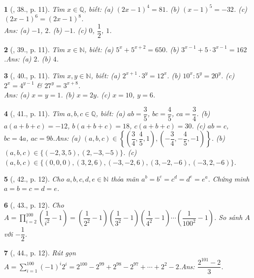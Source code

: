 \documentclass{article}
\newtheorem{baitoan}{}
\begin{document}
\begin{baitoan}[\cite{Binh_Toan_7_tap_1}, 38., p. 11]
	Tìm $x\in\mathbb{Q}$, biết: (a) $(2x - 1)^4 = 81$. (b) $(x - 1)^5 = -32$. (c) $(2x - 1)^6 = (2x - 1)^8$.\\\mbox{}\hfill{\sf Ans: (a) $-1$, $2$. (b) $-1$. (c) $0$, $\dfrac{1}{2}$, $1$.}
\end{baitoan}

\begin{baitoan}[\cite{Binh_Toan_7_tap_1}, 39., p. 11]
	Tìm $x\in\mathbb{N}$, biết: (a) $5^x + 5^{x+2} = 650$. (b) $3^{x-1} + 5\cdot 3^{x-1} = 162$.\hfill{\sf Ans: (a) $2$. (b) $4$.}
\end{baitoan}

\begin{baitoan}[\cite{Binh_Toan_7_tap_1}, 40., p. 11]
	Tìm $x,y\in\mathbb{N}$, biết: (a) $2^{x+1}\cdot 3^y = 12^x$. (b) $10^x:5^y = 20^y$.	(c) $2^x = 4^{y-1}$ \& $27^y = 3^{x+8}$.\\\mbox{}\hfill{\sf Ans: (a) $x = y = 1$. (b) $x = 2y$. (c) $x = 10$, $y = 6$.}
\end{baitoan}

\begin{baitoan}[\cite{Binh_Toan_7_tap_1}, 41., p. 11]
	Tìm $a,b,c\in\mathbb{Q}$, biết: (a) $ab = \dfrac{3}{5}$, $bc = \dfrac{4}{5}$, $ca = \dfrac{3}{4}$.	(b) $a(a + b + c) = -12$, $b(a + b + c) = 18$, $c(a + b + c) = 30$. (c) $ab = c$, $bc = 4a$, $ac = 9b$.\hfill{\sf Ans: (a) $(a,b,c)\in\left\{\left(\dfrac{3}{4},\dfrac{4}{5},1\right),\left(-\dfrac{3}{4},-\dfrac{4}{5},-1\right)\right\}$. (b) $(a,b,c)\in\{(-2,3,5),(2,-3,-5)\}$. (c) $(a,b,c)\in\{(0,0,0),(3,2,6),(-3,-2,6),(3,-2,-6),(-3,2,-6)\}$.}
\end{baitoan}

\begin{baitoan}[\cite{Binh_Toan_7_tap_1}, 42., p. 12]
	Cho $a,b,c,d,e\in\mathbb{N}$ thỏa mãn $a^b = b^c = c^d = d^e = e^a$. Chứng minh $a = b = c = d = e$.
\end{baitoan}

\begin{baitoan}[\cite{Binh_Toan_7_tap_1}, 43., p. 12]
	Cho $A = \prod_{i=2}^{100} \left(\dfrac{1}{i^2} - 1\right) = \left(\dfrac{1}{2^2} - 1\right)\left(\dfrac{1}{3^2} - 1\right)\left(\dfrac{1}{4^2} - 1\right)\cdots\left(\dfrac{1}{100^2} - 1\right)$. So sánh $A$ với $-\dfrac{1}{2}$.
\end{baitoan}

\begin{baitoan}[\cite{Binh_Toan_7_tap_1}, 44., p. 12]
	Rút gọn $A = \sum_{i=1}^{100} (-1)^i2^i = 2^{100} - 2^{99} + 2^{98} - 2^{97} + \cdots + 2^2 - 2$.\hfill{\sf Ans: $\dfrac{2^{101} - 2}{3}$.}
\end{baitoan}
\end{document}
